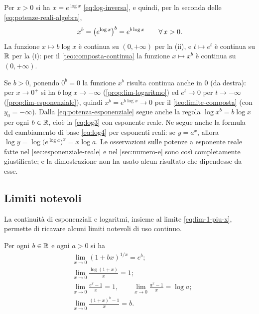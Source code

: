 \begin{dimostrazione}
Per $x>0$ si ha $x=e^{\log x}$ \eqref{eq:log-inversa}, e quindi, per la seconda delle
\eqref{eq:potenze-reali-algebra},
\begin{equation}\label{eq:potenza-esponenziale}
  x^{b}=\bigl(e^{\log x}\bigr)^{b}=e^{b\log x} \qquad\forall\, x>0 .
\end{equation}
La funzione $x\mapsto b\log x$ è continua su $(0,+\infty)$ per la (ii), e $t\mapsto e^{t}$
è continua su $\mathbb{R}$ per la (i): per il \cref{teo:composta-continua} la funzione
$x\mapsto x^{b}$ è continua su $(0,+\infty)$.
\end{dimostrazione}

\begin{osservazione}
Se $b>0$, ponendo $0^{b}=0$ la funzione $x^{b}$ risulta continua anche in $0$ (da destra):
per $x\to0^{+}$ si ha $b\log x\to-\infty$ (\cref{prop:lim-logaritmo}) ed $e^{t}\to0$ per
$t\to-\infty$ (\cref{prop:lim-esponenziale}), quindi $x^{b}=e^{b\log x}\to0$ per il
\cref{teo:limite-composta} (con $y_{0}=-\infty$). Dalla \eqref{eq:potenza-esponenziale}
segue anche la regola $\log x^{b}=b\log x$ per ogni $b\in\mathbb{R}$, cioè la \eqref{eq:log3}
con esponente reale. Ne segue anche la formula del cambiamento di base \eqref{eq:log4} per
esponenti reali: se $y=a^{x}$, allora $\log y=\log\bigl(e^{\log a}\bigr)^{x}=x\log a$. Le
osservazioni sulle potenze a esponente reale fatte nel \cref{sec:esponenziale-reale} e nel
\cref{sec:numero-e} sono così completamente giustificate; e la dimostrazione non ha usato
alcun risultato che dipendesse da esse.
\end{osservazione}

\subsection{Limiti notevoli}

La continuità di esponenziali e logaritmi, insieme al limite \eqref{eq:lim-1-piu-x},
permette di ricavare alcuni limiti notevoli di uso continuo.

\begin{proposizione}\label{prop:limiti-notevoli-exp}
Per ogni $b\in\mathbb{R}$ e ogni $a>0$ si ha
\begin{align}
  &\lim_{x\to0}(1+bx)^{1/x}=e^{b}; \label{eq:ln-e-b}\\
  &\lim_{x\to0}\frac{\log(1+x)}{x}=1; \label{eq:ln-log}\\
  &\lim_{x\to0}\frac{e^{x}-1}{x}=1, \qquad \lim_{x\to0}\frac{a^{x}-1}{x}=\log a; \label{eq:ln-exp}\\
  &\lim_{x\to0}\frac{(1+x)^{b}-1}{x}=b . \label{eq:ln-pot}
\end{align}
\end{proposizione}

